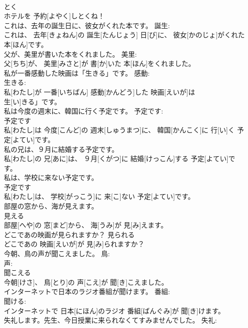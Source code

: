 \documentclass[8pt]{extreport}
\begin{document}
\begin{CJK}{UTF8}{min}
\\	とく 
\\	ホテルを 予約[よやく]しとくね！	
\\	これは、去年の誕生日に、彼女がくれた本です。	誕生: 
\\	これは、 去年[きょねん]の 誕生[たんじょう] 日[び]に、 彼女[かのじょ]がくれた 本[ほん]です。	
\\	父が、美里が書いた本をくれました。	美里: 
\\	父[ちち]が、 美里[みさと]が 書[か]いた 本[ほん]をくれました。	
\\	私が一番感動した映画は「生きる」です。	感動: 
\\	生きる: 
\\	私[わたし]が 一番[いちばん] 感動[かんどう]した 映画[えいが]は
\\	生[い]きる」です。	
\\	私は今度の週末に、韓国に行く予定です。	予定です: 
\\	予定です 
\\	私[わたし]は 今度[こんど]の 週末[しゅうまつ]に、 韓国[かんこく]に 行[い]く 予定[よてい]です。	
\\	私の兄は、９月に結婚する予定です。	
\\	私[わたし]の 兄[あに]は、 ９月[くがつ]に 結婚[けっこん]する 予定[よてい]です。	
\\	私は、学校に来ない予定です。	
\\	予定です 
\\	私[わたし]は、 学校[がっこう]に 来[こ]ない 予定[よてい]です。	
\\	部屋の窓から、海が見えます。	
\\	見える 
\\	部屋[へや]の 窓[まど]から、 海[うみ]が 見[み]えます。	
\\	どこであの映画が見られますか？	見られる 
\\	どこであの 映画[えいが]が 見[み]られますか？	
\\	今朝、鳥の声が聞こえました。	鳥: 
\\	声: 
\\	聞こえる 
\\	今朝[けさ]、 鳥[とり]の 声[こえ]が 聞[き]こえました。	
\\	インターネットで日本のラジオ番組が聞けます。	番組: 
\\	聞ける: 
\\	インターネットで 日本[にほん]のラジオ 番組[ばんぐみ]が 聞[き]けます。	
\\	失礼します。先生、今日授業に来られなくてすみませんでした。	失礼: 

\end{CJK}
\end{document}
